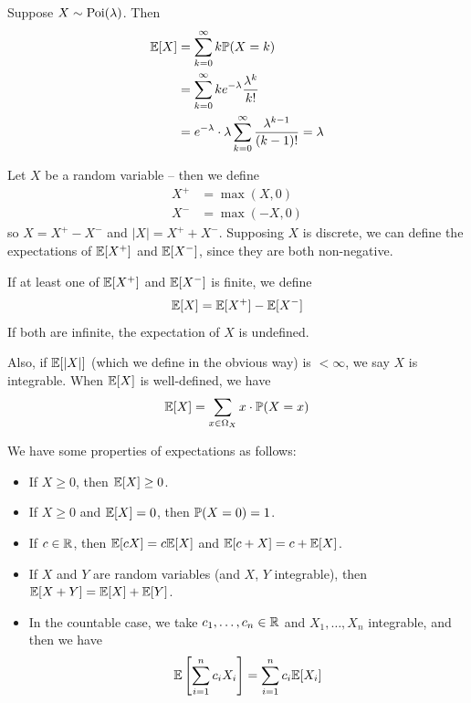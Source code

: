 \documentclass{../../template/note}
\begin{document}
    \begin{example}
        Suppose \(X \sim \operatorname{Poi}(\lambda)\). Then
        \begin{align*}
            \mathbb E[X] &= \sum_{k=0}^\infty k \mathbb P(X = k) \\
            &= \sum_{k=0}^\infty ke^{-\lambda}\frac{\lambda^k}{k!} \\
            &= e^{-\lambda} \cdot \lambda \sum_{k=0}^\infty \frac{\lambda^{k-1}}{(k-1)!} = \lambda
        \end{align*}
    \end{example}
    
    Let \(X\) be a random variable -- then we define
    \begin{align*}
        X^+ &= \max(X, 0) \\
        X^- &= \max(-X, 0)
    \end{align*}
    so \(X = X^+ - X^-\) and \(|X| = X^+ + X^-\). Supposing \(X\) is discrete, we can define the expectations of \(\mathbb E[X^+]\) and \(\mathbb E[X^-]\), since they are both non-negative.

    If at least one of \(\mathbb E[X^+]\) and \(\mathbb E[X^-]\) is finite, we define
    \begin{align*}
        \mathbb E[X] = \mathbb E[X^+] - \mathbb E[X^-]
    \end{align*}
    If both are infinite, the expectation of \(X\) is undefined.

    Also, if \(\mathbb E[|X|]\) (which we define in the obvious way) is \(< \infty\), we say \(X\) is integrable. When \(\mathbb E[X]\) is well-defined, we have
    \begin{align*}
        \mathbb E[X] = \sum_{x \in \Omega_X} x \cdot \mathbb P(X = x)
    \end{align*}
    
    We have some properties of expectations as follows:
    \begin{itemize}
        \item If \(X \geq 0\), then \(\mathbb E[X] \geq 0\).
        \item If \(X \geq 0\) and \(\mathbb E[X] = 0\), then \(\mathbb P(X = 0) = 1\).
        \item If \(c \in \mathbb R\), then \(\mathbb E[cX] = c\mathbb E[X]\) and \(\mathbb E[c + X] = c + \mathbb E[X]\).
        \item If \(X\) and \(Y\) are random variables (and \(X\), \(Y\) integrable), then \(\mathbb E[X + Y] = \mathbb E[X] + \mathbb E[Y]\).
        \item In the countable case, we take \(c_1, \dots, c_n \in \mathbb R\) and \(X_1, \dots, X_n\) integrable, and then we have
        \begin{align*}
            \mathbb E\left[\sum_{i=1}^n c_i X_i\right] = \sum_{i=1}^n c_i \mathbb E[X_i]
        \end{align*}
    \end{itemize}
    
\end{document}
